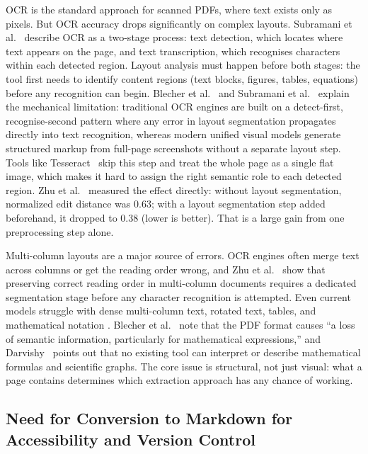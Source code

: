 OCR is the standard approach for scanned PDFs, where text exists only as
pixels. But OCR accuracy drops significantly on complex layouts. Subramani
et al.\ \autocite{subramani2020} describe OCR as a two-stage process: text
detection, which locates where text appears on the page, and text
transcription, which recognises characters within each detected region.
Layout analysis must happen before both stages: the tool first needs to
identify content regions (text blocks, figures, tables, equations) before
any recognition can begin. Blecher et al.\ \autocite{blecher2023} and Subramani
et al.\ \autocite{subramani2020} explain the mechanical limitation: traditional
OCR engines are built on a detect-first, recognise-second pattern where any
error in layout segmentation propagates directly into text recognition,
whereas modern unified visual models generate structured markup from full-page
screenshots without a separate layout step. Tools like
Tesseract~\autocite{smith2007} skip this step and treat the whole page as a
single flat image, which makes it hard to assign the right semantic role to
each detected region. Zhu et al.\ \autocite{zhu2022} measured the effect
directly: without layout segmentation, normalized edit distance was 0.63;
with a layout segmentation step added beforehand, it dropped to 0.38 (lower
is better). That is a large gain from one preprocessing step alone.

Multi-column layouts are a major source of errors. OCR engines often merge
text across columns or get the reading order wrong, and Zhu et
al.\ \autocite{zhu2022} show that preserving correct reading order in
multi-column documents requires a dedicated segmentation stage before any
character recognition is attempted. Even current models struggle with dense
multi-column text, rotated text, tables, and mathematical notation
\autocite{subramani2020, meuschke2023}. Blecher et al.\ \autocite{blecher2023}
note that the PDF format causes ``a loss of semantic information,
particularly for mathematical expressions,'' and Darvishy~\autocite{darvishy2018}
points out that no existing tool can interpret or describe mathematical
formulas and scientific graphs. The core issue is structural, not just
visual: what a page contains determines which extraction approach has any
chance of working.

\subsection{Need for Conversion to Markdown for Accessibility and Version Control}

